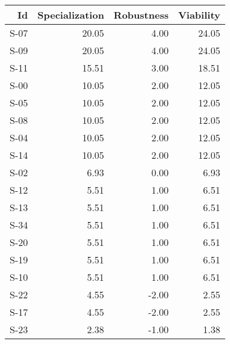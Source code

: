 \begin{tabular}{ | r | r | r | r | }
    \hline
                    Id  &  Specialization  &      Robustness  &       Viability  \\
    \hline
    \hline
                  S-07  &           20.05  &            4.00  &           24.05  \\
    \hline
                  S-09  &           20.05  &            4.00  &           24.05  \\
    \hline
                  S-11  &           15.51  &            3.00  &           18.51  \\
    \hline
                  S-00  &           10.05  &            2.00  &           12.05  \\
    \hline
                  S-05  &           10.05  &            2.00  &           12.05  \\
    \hline
                  S-08  &           10.05  &            2.00  &           12.05  \\
    \hline
                  S-04  &           10.05  &            2.00  &           12.05  \\
    \hline
                  S-14  &           10.05  &            2.00  &           12.05  \\
    \hline
                  S-02  &            6.93  &            0.00  &            6.93  \\
    \hline
                  S-12  &            5.51  &            1.00  &            6.51  \\
    \hline
                  S-13  &            5.51  &            1.00  &            6.51  \\
    \hline
                  S-34  &            5.51  &            1.00  &            6.51  \\
    \hline
                  S-20  &            5.51  &            1.00  &            6.51  \\
    \hline
                  S-19  &            5.51  &            1.00  &            6.51  \\
    \hline
                  S-10  &            5.51  &            1.00  &            6.51  \\
    \hline
                  S-22  &            4.55  &           -2.00  &            2.55  \\
    \hline
                  S-17  &            4.55  &           -2.00  &            2.55  \\
    \hline
                  S-23  &            2.38  &           -1.00  &            1.38  \\

\end{tabular}
